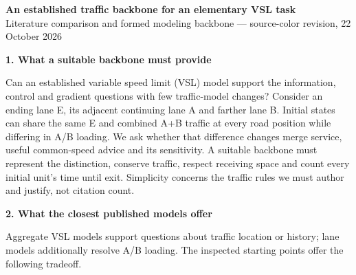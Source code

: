 \documentclass[10pt,a4paper]{article}
\newcommand{\head}[1]{\par\vspace{5pt}\noindent\textbf{#1}\par\nobreak\vspace{1pt}}
\begin{document}
\begin{center}
{\large\bfseries An established traffic backbone for an elementary VSL task}\\[3pt]
Literature comparison and formed modeling backbone --- source-color revision, 22 October 2026
\end{center}
\vspace{-3pt}

\head{1. What a suitable backbone must provide}
Can an established variable speed limit (VSL) model support the information,
control and gradient questions with few traffic-model changes? Consider an
ending lane E, its adjacent continuing lane A and farther lane B. Initial
states can share the same E and combined A+B traffic at every road position
while differing in A/B loading. We ask whether that difference changes merge
service, useful common-speed advice and its sensitivity. A suitable backbone
must represent the distinction, conserve traffic, respect receiving space
and count every initial unit's time until exit. Simplicity concerns the
traffic rules we must author and justify, not citation count.

\head{2. What the closest published models offer}
Aggregate VSL models support questions about traffic location or history;
lane models additionally resolve A/B loading. The inspected starting points
offer the following tradeoff.
\end{document}
